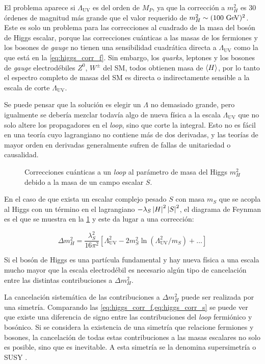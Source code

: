 El problema aparece si $\Lambda_\text{UV}$ es del orden de $M_P$, ya que la
corrección a $m_H^2$ es 30 órdenes de magnitud más grande que el valor requerido
de $m_H^2 \sim (100 \gev)^2$. Este es solo un problema para las correcciones al
cuadrado de la masa del bosón de Higgs escalar, porque las correcciones
cuánticas a las masas de los fermiones y los bosones de \emph{gauge} no tienen una
sensibilidad cuadrática directa a $\Lambda_\text{UV}$ como la que está en la
\cref{eq:higgs_corr_f}. Sin embargo, los \emph{quarks}, leptones y los bosones de \emph{gauge}
electrodébiles $Z^0$, $W^{\pm}$ del SM, todos obtienen masa de $\langle H \rangle$, por
lo tanto el espectro completo de masas del SM es directa o indirectamente
sensible a la escala de corte $\Lambda_\text{UV}$.

Se puede pensar que la solución es elegir un $\Lambda$ no demasiado grande, pero
igualmente se debería mezclar todavía algo de nueva física a la escala
$\Lambda_\text{UV}$ que no solo altere los propagadores en el \emph{loop}, sino que
corte la integral. Esto no es fácil en una teoría cuyo lagrangiano no contiene
más de dos derivadas, y las teorías de mayor orden en derivadas generalmente
sufren de fallas de unitariedad o causalidad.

\begin{figure}[!htbp]
  \centering 
  \caption{Correcciones cuánticas a un \emph{loop} al parámetro de masa del Higgs
    $m_H^2$ debido a la masa de un campo escalar $S$.}
  \label{fig:higgs_correction_s}
\end{figure}

En el caso de que exista un escalar complejo pesado $S$ con masa $m_S$ que se
acopla al Higgs con un término en el lagrangiano $-\lambda_S \left| H \right|^2 \left| S \right|^2$,
el diagrama de Feynman es el que se muestra en la
\cref{fig:higgs_correction_s} y este da lugar a una corrección:

\begin{equation}
  \Delta m_H^2 = \frac{\lambda_S^2}{16\pi^2} \left[ \Lambda^2_\text{UV} - 2
    m_S^2 \ln (\Lambda^2_\text{UV}/m_S) + \ldots \right]
  \label{eq:higgs_corr_s}
\end{equation}

Si el bosón de Higgs es una partícula fundamental y hay nueva física a una escala
mucho mayor que la escala electrodébil
es necesario algún tipo de cancelación entre las
distintas contribuciones a $\Delta m_H^2$.

La cancelación sistemática de las contribuciones a $\Delta m_H^2$ puede ser
realizada por una simetría. Comparando las
\cref{eq:higgs_corr_f,eq:higgs_corr_s} se puede ver que existe una diferencia de
signo entre las contribuciones del \emph{loop} fermiónico y bosónico. Si se
considera la existencia de una simetría que relacione fermiones y bosones, la
cancelación de todas estas contribuciones a las masas escalares no solo es
posible, sino que es inevitable. A esta simetría se la denomina supersimetría o
SUSY \cite{Martin:1997ns}.

